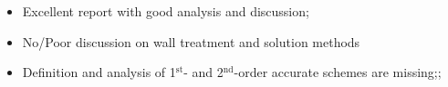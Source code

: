 \documentclass[14pt,twoside]{report}
\newcommand\blankpage{%
    \null
    \thispagestyle{empty}%
    \addtocounter{page}{-1}%
    \newpage}
\begin{document}
\clearpage 



\bigskip


\medskip

  \begin{itemize}
%
     \item Excellent report with good analysis and discussion; 
     \item No/Poor discussion on wall treatment and solution methods
     \item Definition and analysis of 1$^{\text{st}}$- and 2$^{\text{nd}}$-order accurate schemes are missing;;
%
%
  \end{itemize}%

\clearpage 


\end{document}
